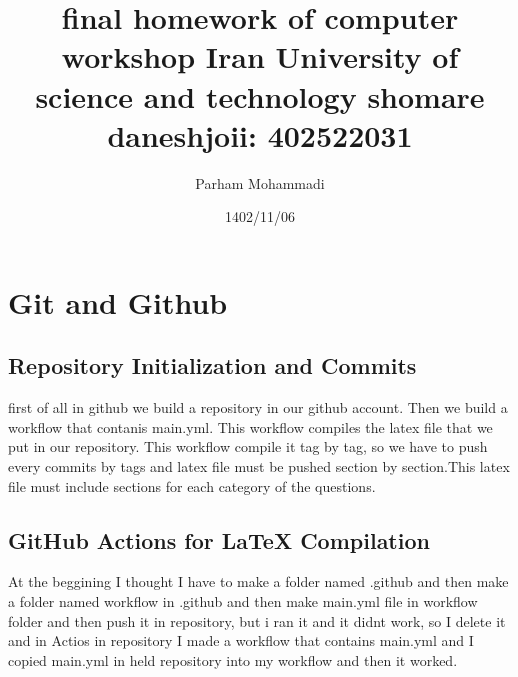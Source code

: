 \documentclass[titlepage]{article}
\title{ \textbf{final homework of computer workshop} \newline Iran University of science and technology \newline \newline shomare daneshjoii: 402522031}
\author{Parham Mohammadi }
\date{1402/11/06}
\begin{document}
\maketitle

\pagestyle{fancy}
\fancyhead[R]{}

\tableofcontents
\newpage
{}
\fancyhead[R]{}
\section{Git and Github}
\subsection{ Repository Initialization and Commits}
first of all in github we build a repository in our github account. Then we build a workflow that contanis main.yml. This workflow compiles the latex file that we put in our repository. This workflow compile it tag by tag, so we have to push every commits by tags and latex file must be pushed section by section.This latex file must include sections for each category of the questions.
\subsection{ GitHub Actions for LaTeX Compilation}
At the beggining I thought I have to make a folder named .github and then make a folder named workflow in .github and then make main.yml file in workflow folder and then push it in repository, but i ran it and it didnt work, so I delete it and in Actios in repository I made a workflow that contains main.yml and I copied main.yml in held repository into my workflow and then it worked.
\end{document}
